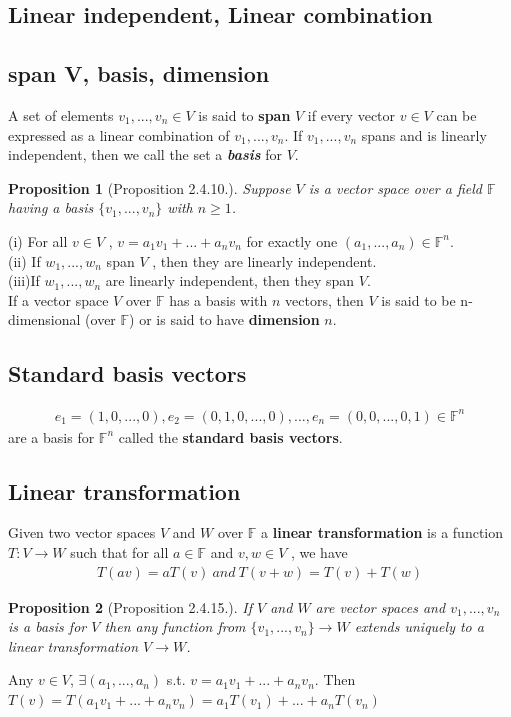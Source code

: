 \documentclass[11pt,a4paper]{article}
\newtheorem{proposition}{Proposition}
\begin{document}
\subsection{Linear independent, Linear combination}
\subsection{span V, basis, dimension}
A set of elements $v_1,...,v_n\in V$ is said to \textbf{span} $V$ if every vector $v\in V$ can be expressed as a linear combination of $v_1,...,v_n$. If $v_1,...,v_n$ spans and is linearly independent, then we call the set a \textbf{\textit{basis}} for $V$.
\begin{proposition}[Proposition 2.4.10.]
    Suppose $V$ is a vector space over a field $\mathbb{F}$ having a basis $\{v_1,...,v_n\}$ with $n \geq 1$.
\end{proposition}
(i) For all $v \in V$ , $v = a_1 v_1 + ... + a_n v_n$ for exactly one $(a_1,...,a_n)\in \mathbb{F}^n$.\\
(ii) If $w_1,...,w_n$ span $V$ , then they are linearly independent.\\
(iii)If $w_1,...,w_n$ are linearly independent, then they span $V$.\\
If a vector space $V$ over $\mathbb{F}$ has a basis with $n$ vectors, then $V$ is said to be n-dimensional (over $\mathbb{F}$) or is said to have \textbf{dimension} $n$.
\subsection{Standard basis vectors}
\begin{equation}
    \begin{aligned}
        e_1=(1,0,...,0),e_2=(0,1,0,...,0),...,e_n=(0,0,...,0,1)\in \mathbb{F}^n
    \end{aligned}
    \nonumber
\end{equation}
are a basis for $\mathbb{F}^n$ called the \textbf{standard basis vectors}.
\subsection{Linear transformation}
Given two vector spaces $V$ and $W$ over $\mathbb{F}$ a \textbf{linear transformation} is a function $T : V \rightarrow	 W$ such that
for all $a \in \mathbb{F}$ and $v,w \in V$ , we have
\begin{equation}
    \begin{aligned}
        T(av)=aT(v)\ and\ T(v+w)=T(v)+T(w)
    \end{aligned}
    \nonumber
\end{equation}
\begin{proposition}[Proposition 2.4.15.]
    If $V$ and $W$ are vector spaces and $v_1,...,v_n$ is a basis for $V$ then any function
    from $\{v_1,...,v_n\}\rightarrow W$ extends \textit{uniquely} to a linear transformation $V \rightarrow W$.
\end{proposition}
Any $v\in V$, $\exists (a_1,...,a_n)$ s.t. $v=a_1 v_1+...+a_n v_n$. Then $T(v)=T(a_1 v_1+...+a_n v_n)=a_1T(v_1)+...+a_nT(v_n)$\\
\end{document}
